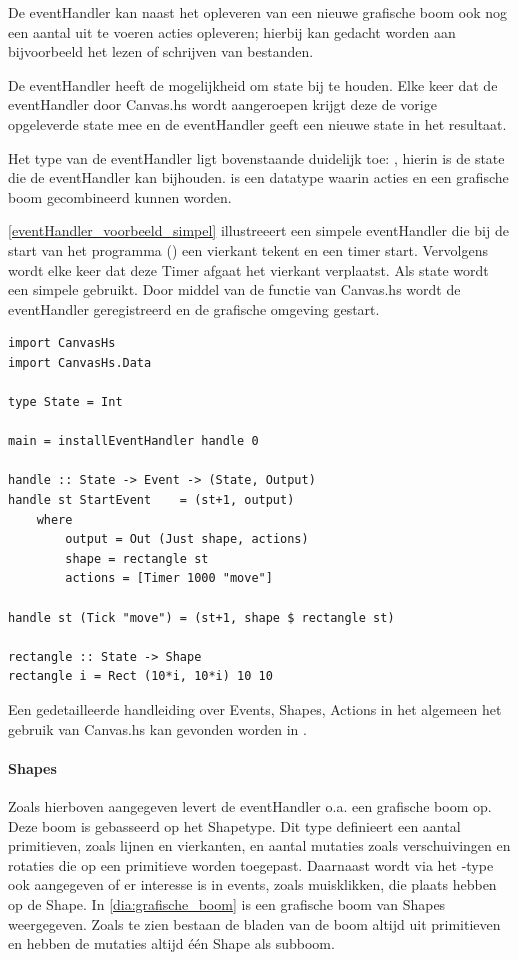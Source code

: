 De eventHandler kan naast het opleveren van een nieuwe grafische boom ook nog een aantal uit te voeren acties opleveren; hierbij kan gedacht worden aan bijvoorbeeld het lezen of schrijven van bestanden. 

De eventHandler heeft de mogelijkheid om state bij te houden. Elke keer dat de eventHandler door Canvas.hs wordt aangeroepen krijgt deze de vorige opgeleverde state mee en de eventHandler geeft een nieuwe state in het resultaat. 

Het type van de eventHandler ligt bovenstaande duidelijk toe: , hierin is  de state die de eventHandler kan bijhouden.  is een datatype waarin acties en een grafische boom gecombineerd kunnen worden.

\autoref{eventHandler_voorbeeld_simpel} illustreeert een simpele eventHandler die bij de start van het programma () een vierkant tekent en een timer start. Vervolgens wordt elke keer dat deze Timer afgaat het vierkant verplaatst. Als state wordt een simpele  gebruikt. Door middel van de  functie van Canvas.hs wordt de eventHandler geregistreerd en de grafische omgeving gestart.

\begin{lstlisting}[caption=Voorbeeld van een simpele eventHandler, label=eventHandler_voorbeeld_simpel]
import CanvasHs
import CanvasHs.Data

type State = Int

main = installEventHandler handle 0

handle :: State -> Event -> (State, Output)
handle st StartEvent    = (st+1, output)
	where 
		output = Out (Just shape, actions)
		shape = rectangle st
		actions = [Timer 1000 "move"]
		
handle st (Tick "move") = (st+1, shape $ rectangle st)
		
rectangle :: State -> Shape
rectangle i = Rect (10*i, 10*i) 10 10
\end{lstlisting}

Een gedetailleerde handleiding over Events, Shapes, Actions in het algemeen het gebruik van Canvas.hs kan gevonden worden in .

\paragraph{Shapes}
\label{par:globaal_shapes}
Zoals hierboven aangegeven levert de eventHandler o.a. een grafische boom op. Deze boom is gebasseerd op het Shapetype. Dit type definieert een aantal primitieven, zoals lijnen en vierkanten, en aantal mutaties zoals verschuivingen en rotaties die op een primitieve worden toegepast. Daarnaast wordt via het -type ook aangegeven of er interesse is in events, zoals muisklikken, die plaats hebben op de Shape. In \autoref{dia:grafische_boom} is een grafische boom van Shapes weergegeven. Zoals te zien bestaan de bladen van de boom altijd uit primitieven en hebben de mutaties altijd één Shape als subboom.

